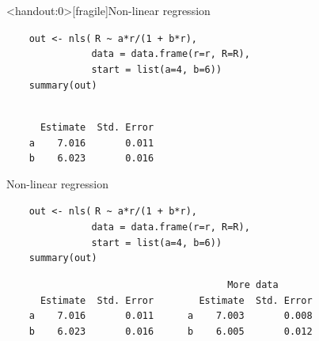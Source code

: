 \documentclass[aspectratio=169,12pt,t]{beamer}
\begin{document}
\begin{frame}<handout:0>[fragile]{Non-linear regression}
\addtocounter{framenumber}{-1}

\vspace{5mm}

\verb|    out <- nls(| {\tt \vhilit R \verb|~| a*r/(1 + b*r)}\verb|,| \\
\verb|               data = data.frame(r=r, R=R),| \\
\verb|               start = list(a=4, b=6))| \\
\verb|    summary(out)|

\vspace{8mm}

{\hilit
\verb|                          | \\
\verb|      Estimate  Std. Error| \\
\verb|    a    7.016       0.011| \\
\verb|    b    6.023       0.016|
}


\end{frame}


\begin{frame}[fragile]{Non-linear regression}
\addtocounter{framenumber}{-1}

\vspace{5mm}

\verb|    out <- nls(| {\tt \vhilit R \verb|~| a*r/(1 + b*r)}\verb|,| \\
\verb|               data = data.frame(r=r, R=R),| \\
\verb|               start = list(a=4, b=6))| \\
\verb|    summary(out)|

\vspace{8mm}

{\hilit
\verb|                                       More data      | \\
\verb|      Estimate  Std. Error        Estimate  Std. Error| \\
\verb|    a    7.016       0.011      a    7.003       0.008| \\
\verb|    b    6.023       0.016      b    6.005       0.012|
}



\end{frame}
\end{document}
